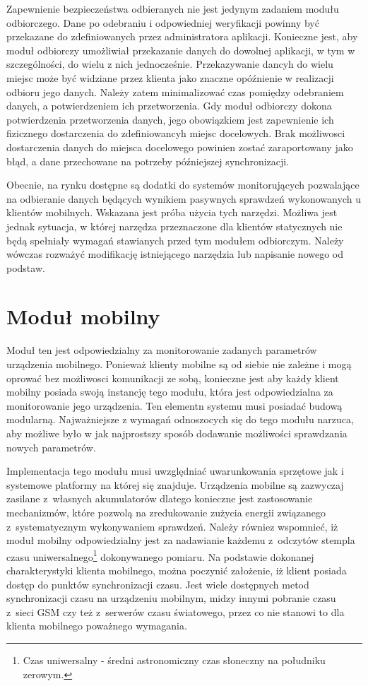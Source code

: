 Zapewnienie bezpieczeństwa odbieranych nie jest jedynym zadaniem
modułu odbiorczego. Dane po odebraniu i odpowiedniej weryfikacji
powinny być przekazane do zdefiniowanych przez administratora
aplikacji. Konieczne jest, aby moduł odbiorczy umożliwiał przekazanie
danych do dowolnej aplikacji, w tym w szczególności, do wielu z nich
jednocześnie. Przekazywanie dancyh do wielu miejsc może być widziane
przez klienta jako znaczne opóźnienie w realizacji odbioru jego
danych. Należy zatem minimalizować czas pomiędzy odebraniem danych, a
potwierdzeniem ich przetworzenia. Gdy moduł odbiorczy dokona
potwierdzenia przetworzenia danych, jego obowiązkiem jest zapewnienie
ich fizicznego dostarczenia do zdefiniowancyh miejsc docelowych. Brak
możliwosci dostarczenia danych do miejsca docelowego powinien zostać
zaraportowany jako błąd, a dane przechowane na potrzeby późniejszej
synchronizacji.

Obecnie, na rynku dostępne są dodatki do systemów monitorujących
pozwalające na odbieranie danych będących wynikiem pasywnych sprawdzeń
wykonowanych u klientów mobilnych. Wskazana jest próba użycia tych
narzędzi. Możliwa jest jednak sytuacja, w której narzędza przeznaczone
dla klientów statycznych nie będą spełniały wymagań stawianych przed
tym modułem odbiorczym. Należy wówczas rozważyć modifikację
istniejącego narzędzia lub napisanie nowego od podstaw.


\section[Moduł mobilny][Moduł mobilny]{Moduł mobilny}

Moduł ten jest odpowiedzialny za monitorowanie zadanych parametrów
urządzenia mobilnego. Ponieważ klienty mobilne są od siebie nie zależne
i mogą oprować bez możliwosci komunikacji ze sobą, konieczne jest aby
każdy klient mobilny posiada swoją instancję tego modułu, która jest
odpowiedzialna za monitorowanie jego urządzenia. Ten elementn systemu
musi posiadać budową modularną. Najważniejsze z wymagań
odnoszocych się do tego modułu narzuca, aby możliwe było w jak
najprostszy sposób dodawanie możliwości sprawdzania nowych parametrów.

Implementacja tego modułu musi uwzględniać uwarunkowania sprzętowe jak
i systemowe platformy na której się znajduje. Urządzenia mobilne są
zazwyczaj zasilane z~własnych akumulatorów dlatego konieczne jest
zastosowanie mechanizmów, które pozwolą na zredukowanie zużycia
energii związanego z~systematycznym wykonywaniem sprawdzeń. Należy
równiez wspomnieć, iż moduł mobilny odpowiedzialny jest za nadawianie
każdemu z~odczytów stempla czasu uniwersalnego\footnote{Czas
  uniwersalny - średni astronomiczny czas słoneczny na południku
  zerowym.} dokonywanego pomiaru. Na podstawie dokonanej
charakterystyki klienta mobilnego, można poczynić założenie, iż klient
posiada dostęp do punktów synchronizacji czasu. Jest wiele dostępnych
metod synchronizacji czasu na urządzeniu mobilnym, midzy innymi
pobranie czasu z~sieci GSM czy też z~serwerów czasu światowego, przez
co nie stanowi to dla klienta mobilnego poważnego wymagania. 

